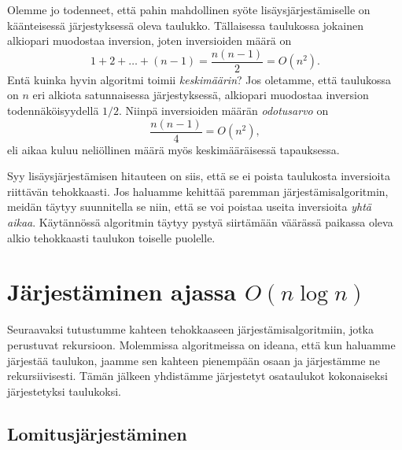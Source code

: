 Olemme jo todenneet, että pahin mahdollinen syöte
lisäysjärjestämiselle on käänteisessä järjestyksessä oleva taulukko.
Tällaisessa taulukossa jokainen alkiopari muodostaa inversion,
joten inversioiden määrä on
\[1+2+\dots+(n-1)=\frac{n(n-1)}{2}=O(n^2).\]
Entä kuinka hyvin algoritmi toimii \emph{keskimäärin}?
Jos oletamme, että taulukossa on $n$ eri alkiota satunnaisessa
järjestyksessä, alkiopari muodostaa inversion todennäköisyydellä $1/2$.
Niinpä inversioiden määrän \emph{odotusarvo} on
\[\frac{n(n-1)}{4}=O(n^2),\]
eli aikaa kuluu neliöllinen määrä myös keskimääräisessä
tapauksessa.

Syy lisäysjärjestämisen hitauteen on siis,
että se ei poista taulukosta inversioita riittävän tehokkaasti.
Jos haluamme kehittää paremman järjestämis\-algoritmin,
meidän täytyy suunnitella se niin, että se voi poistaa
useita inversioita \emph{yhtä aikaa}.
Käytännössä algoritmin täytyy pystyä siirtämään
väärässä paikassa oleva alkio tehokkaasti taulukon
toiselle puolelle.

\section{Järjestäminen ajassa $O(n \log n)$}

Seuraavaksi tutustumme kahteen tehokkaaseen
järjestämisalgoritmiin, jotka perustuvat rekursioon.
Molemmissa algoritmeissa on ideana,
että kun haluamme järjestää taulukon,
jaamme sen kahteen pienempään osaan
ja järjestämme ne rekursiivisesti.
Tämän jälkeen yhdistämme järjestetyt osataulukot
kokonaiseksi järjestetyksi taulukoksi.


\subsection{Lomitusjärjestäminen}

